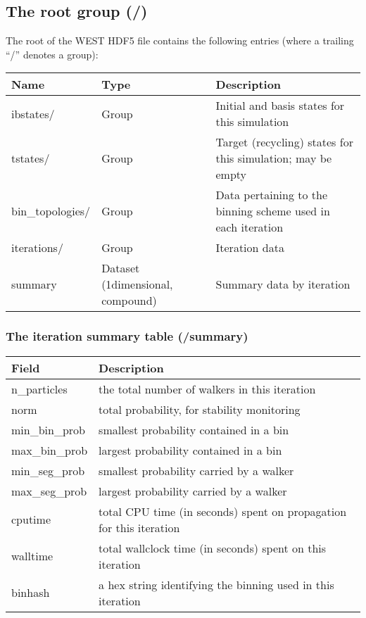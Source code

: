 \documentclass[letterpaper,10pt,english]{sphinxmanual}
\begin{document}
\subsection{The root group (/)}
\label{\detokenize{users_guide/hdf5:the-root-group}}
The root of the WEST HDF5 file contains the following entries (where a
trailing “/” denotes a group):


\begin{savenotes}\sphinxattablestart
\centering
\begin{tabulary}{\linewidth}[t]{|T|T|T|}
\hline
\sphinxstyletheadfamily 
Name
&\sphinxstyletheadfamily 
Type
&\sphinxstyletheadfamily 
Description
\\
\hline
ibstates/
&
Group
&
Initial and basis states for this
simulation
\\
\hline
tstates/
&
Group
&
Target (recycling) states for this
simulation; may be empty
\\
\hline
bin\_topologies/
&
Group
&
Data pertaining to the binning scheme
used in each iteration
\\
\hline
iterations/
&
Group
&
Iteration data
\\
\hline
summary
&
Dataset (1\sphinxhyphen{}dimensional,
compound)
&
Summary data by iteration
\\
\hline
\end{tabulary}
\par
\sphinxattableend\end{savenotes}


\subsubsection{The iteration summary table (/summary)}
\label{\detokenize{users_guide/hdf5:the-iteration-summary-table-summary}}

\begin{savenotes}\sphinxattablestart
\centering
\begin{tabulary}{\linewidth}[t]{|T|T|}
\hline
\sphinxstyletheadfamily 
Field
&\sphinxstyletheadfamily 
Description
\\
\hline
n\_particles
&
the total number of walkers in this iteration
\\
\hline
norm
&
total probability, for stability monitoring
\\
\hline
min\_bin\_prob
&
smallest probability contained in a bin
\\
\hline
max\_bin\_prob
&
largest probability contained in a bin
\\
\hline
min\_seg\_prob
&
smallest probability carried by a walker
\\
\hline
max\_seg\_prob
&
largest probability carried by a walker
\\
\hline
cputime
&
total CPU time (in seconds) spent on propagation for this
iteration
\\
\hline
walltime
&
total wallclock time (in seconds) spent on this iteration
\\
\hline
binhash
&
a hex string identifying the binning used in this iteration
\\
\hline
\end{tabulary}
\par
\sphinxattableend\end{savenotes}
\end{document}
